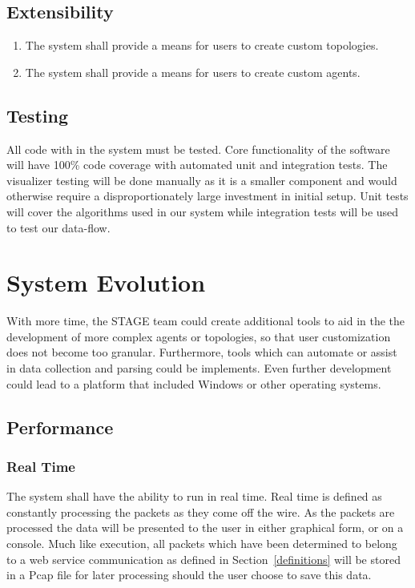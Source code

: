 \documentclass[titlepage]{article}
\begin{document}
\subsection{Extensibility%
  \label{extensibility}%
}
\begin{enumerate}
    \item The system shall provide a means for users to create custom topologies.
    \item The system shall provide a means for users to create custom agents.
\end{enumerate}

\subsection{Testing%
    \label{testing}%
}
All code with in the system must be tested. Core functionality of the software will have 100\% code coverage with automated unit and integration tests.  The visualizer testing will be done manually as it is a smaller component and would otherwise require a disproportionately large investment in initial setup.  Unit tests will cover the algorithms used in our system while integration tests will be used to test our data-flow.  

\section{System Evolution}

With more time, the STAGE team could create additional tools to aid in the the development of more complex agents or topologies, so that user customization does not become too granular.  Furthermore, tools which can automate or assist in data collection and parsing could be implements.  Even further development could lead to a platform that included Windows or other operating systems.


\subsection{Performance%
    \label{performance}%
}


\subsubsection{Real Time}\label{realtime} 
The system shall have the ability to run in real time. Real time is defined as
constantly processing the packets as they come off the wire. As the packets are
processed the data will be presented to the user in either graphical form, or
on a console.  Much like  execution, all packets which
have been determined to belong to a web service communication as defined in
Section~\ref{definitions} will be stored in a Pcap file for later processing
should the user choose to save this data.
\end{document}
